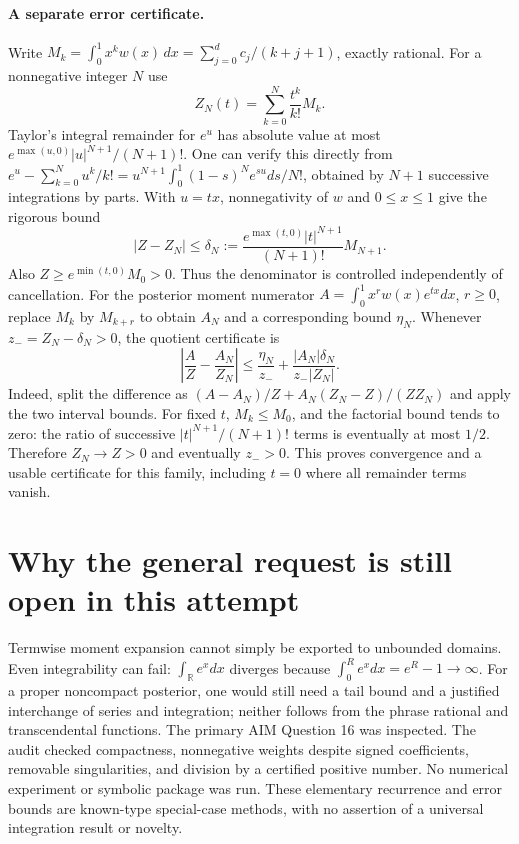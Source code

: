 \documentclass[11pt]{article}
\begin{document}
\paragraph{A separate error certificate.}
Write
$M_k=\int_0^1x^kw(x)\,dx=\sum_{j=0}^d c_j/(k+j+1)$, exactly rational.
For a nonnegative integer $N$ use
\[
 Z_N(t)=\sum_{k=0}^N\frac{t^k}{k!}M_k.
\]
Taylor's integral remainder for $e^u$ has absolute value at most
$e^{\max(u,0)}|u|^{N+1}/(N+1)!$. One can verify this directly from
$e^u-\sum_{k=0}^Nu^k/k!=u^{N+1}\int_0^1(1-s)^Ne^{su}ds/N!$,
obtained by $N+1$ successive integrations by parts. With $u=tx$,
nonnegativity of $w$ and $0\le x\le1$ give the rigorous bound
\[
 |Z-Z_N|\le\delta_N:=
 \frac{e^{\max(t,0)}|t|^{N+1}}{(N+1)!}M_{N+1}.
\]
Also $Z\ge e^{\min(t,0)}M_0>0$. Thus the denominator is controlled
independently of cancellation. For the posterior moment numerator
$A=\int_0^1x^r w(x)e^{tx}dx$, $r\ge0$, replace $M_k$ by $M_{k+r}$
to obtain $A_N$ and a corresponding bound $\eta_N$.
Whenever $z_-=Z_N-\delta_N>0$, the quotient certificate is
\[
\left|\frac A Z-\frac{A_N}{Z_N}\right|
\le \frac{\eta_N}{z_-}
 +\frac{|A_N|\delta_N}{z_-|Z_N|}.
\]
Indeed, split the difference as $(A-A_N)/Z+
A_N(Z_N-Z)/(ZZ_N)$ and apply the two interval bounds.
For fixed $t$, $M_k\le M_0$, and the factorial bound tends to zero:
the ratio of successive $|t|^{N+1}/(N+1)!$ terms is eventually at most
$1/2$. Therefore $Z_N\to Z>0$ and eventually $z_->0$.
This proves convergence and a usable certificate for this family,
including $t=0$ where all remainder terms vanish.

\section{Why the general request is still open in this attempt}
Termwise moment expansion cannot simply be exported to unbounded domains.
Even integrability can fail: $\int_{\mathbb R}e^x dx$ diverges because
$\int_0^R e^x dx=e^R-1\to\infty$. For a proper noncompact posterior,
one would still need a tail bound and a justified interchange of series
and integration; neither follows from the phrase rational and
transcendental functions. The primary AIM Question 16 was inspected.
The audit checked compactness, nonnegative weights despite signed
coefficients, removable singularities, and division by a certified
positive number. No numerical experiment or symbolic package was run.
These elementary recurrence and error bounds are known-type special-case
methods, with no assertion of a universal integration result or novelty.
\end{document}
